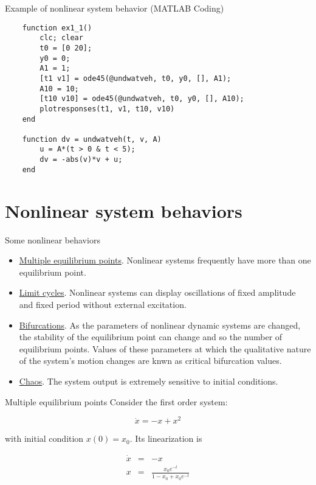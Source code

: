 \documentclass{beamer}
\begin{document}
\begin{frame}[fragile]{Example of nonlinear system behavior (MATLAB Coding)}
\begin{verbatim}
	function ex1_1()
	    clc; clear
	    t0 = [0 20];
	    y0 = 0;
	    A1 = 1;
	    [t1 v1] = ode45(@undwatveh, t0, y0, [], A1);    
	    A10 = 10;
	    [t10 v10] = ode45(@undwatveh, t0, y0, [], A10); 
	    plotresponses(t1, v1, t10, v10)
	end
	
	function dv = undwatveh(t, v, A)
	    u = A*(t > 0 & t < 5);
	    dv = -abs(v)*v + u;
	end
\end{verbatim}
\end{frame}

\section{Nonlinear system behaviors}
\begin{frame}{Some nonlinear behaviors}
\begin{itemize}
	\item \underline{Multiple equilibrium points}. Nonlinear systems frequently have more than one equilibrium point.	\vspace{1em}
	
	\item \underline{Limit cycles}. Nonlinear systems can display oscillations of fixed amplitude and fixed period without external excitation.												\vspace{1em}
	
	\item \underline{Bifurcations}. As the parameters of nonlinear dynamic systems are changed, the stability of the equilibrium point can change and so the number of equilibrium points. Values of these parameters at which the qualitative nature of the system's motion changes are knwn as critical bifurcation values.	\vspace{1em}
	
	\item \underline{Chaos}. The system output is extremely sensitive to initial conditions.
\end{itemize}
\end{frame}

\begin{frame}{Multiple equilibrium points}
Consider the first order system:

\begin{equation}
\dot{x} = -x + x^2
\end{equation}

with initial condition $x(0) = x_0$. Its linearization is
\pause

\begin{eqnarray}
\dot{x} &=& -x 			\\
x &=& \frac{x_0 e^{-t}}{1 - x_0 + x_0e^{-t}}
\end{eqnarray}
\end{frame}
\end{document}
